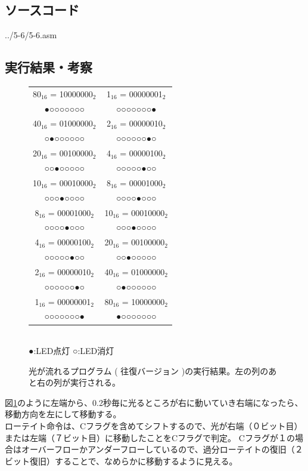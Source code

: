 \documentclass[a4paper,12pt]{ujarticle}
\begin{document}
  \subsection{ソースコード}
   \begin{lstinputlisting}[basicstyle=\ttfamily\footnotesize, frame=single,numbers=left]
   {../5-6/5-6.asm}
   \end{lstinputlisting}
   \subsection{実行結果・考察}
   \begin{figure}[htbp]
    \begin{center}
     \begin{tabular}{c|c}
      {80}$_{16}$ = 10000000$_2$ & {1}$_{16}$  = 00000001$_2$ \\
      ●○○○○○○○            & ○○○○○○○● \\
      {40}$_{16}$ = 01000000$_2$ & {2}$_{16}$  = 00000010$_2$ \\
      ○●○○○○○○            & ○○○○○○●○ \\
      {20}$_{16}$ = 00100000$_2$ & {4}$_{16}$  = 00000100$_2$ \\
      ○○●○○○○○            & ○○○○○●○○ \\
      {10}$_{16}$ = 00010000$_2$ & {8}$_{16}$  = 00001000$_2$ \\
      ○○○●○○○○            & ○○○○●○○○ \\
      {8}$_{16}$  = 00001000$_2$ & {10}$_{16}$ = 00010000$_2$ \\
      ○○○○●○○○            & ○○○●○○○○ \\
      {4}$_{16}$  = 00000100$_2$ & {20}$_{16}$ = 00100000$_2$ \\
      ○○○○○●○○            & ○○●○○○○○ \\
      {2}$_{16}$  = 00000010$_2$ & {40}$_{16}$ = 01000000$_2$ \\
      ○○○○○○●○            & ○●○○○○○○ \\
      {1}$_{16}$  = 00000001$_2$ & {80}$_{16}$ = 10000000$_2$ \\
      ○○○○○○○●            & ●○○○○○○○ \\
     \end{tabular}\\
     ●:LED点灯 ○:LED消灯
     \caption{光が流れるプログラム ( 往復バージョン )の実行結果。左の列のあと右の列が実行される。}
     \label{fig:out_5-6}
    \end{center}
   \end{figure}
   図\ref{fig:out_5-6}のように左端から、0.2秒毎に光るところが右に動いていき右端になったら、移動方向を左にして移動する。
   \\
   ローテイト命令は、Cフラグを含めてシフトするので、光が右端（０ビット目）または左端（７ビット目）に移動したことをCフラグで判定。
   Cフラグが１の場合はオーバーフローかアンダーフローしているので、過分ローテイトの復旧（２ビット復旧）することで、なめらかに移動するように見える。
\end{document}
